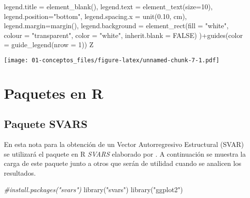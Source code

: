 \documentclass[
]{book}
\newenvironment{Shaded}{\begin{snugshade}}{\end{snugshade}}
\newcommand{\AttributeTok}[1]{\textcolor[rgb]{0.77,0.63,0.00}{#1}}
\newcommand{\CommentTok}[1]{\textcolor[rgb]{0.56,0.35,0.01}{\textit{#1}}}
\newcommand{\ConstantTok}[1]{\textcolor[rgb]{0.00,0.00,0.00}{#1}}
\newcommand{\DecValTok}[1]{\textcolor[rgb]{0.00,0.00,0.81}{#1}}
\newcommand{\FloatTok}[1]{\textcolor[rgb]{0.00,0.00,0.81}{#1}}
\newcommand{\FunctionTok}[1]{\textcolor[rgb]{0.00,0.00,0.00}{#1}}
\newcommand{\NormalTok}[1]{#1}
\newcommand{\SpecialCharTok}[1]{\textcolor[rgb]{0.00,0.00,0.00}{#1}}
\newcommand{\StringTok}[1]{\textcolor[rgb]{0.31,0.60,0.02}{#1}}
\begin{document}
\begin{Shaded}
\begin{Highlighting}[]
           \AttributeTok{legend.title =} \FunctionTok{element\_blank}\NormalTok{(),}
           \AttributeTok{legend.text  =} \FunctionTok{element\_text}\NormalTok{(}\AttributeTok{size=}\DecValTok{10}\NormalTok{),}
           \AttributeTok{legend.position=}\StringTok{"bottom"}\NormalTok{,}
           \AttributeTok{legend.spacing.x =} \FunctionTok{unit}\NormalTok{(}\FloatTok{0.10}\NormalTok{, }\StringTok{\textquotesingle{}cm\textquotesingle{}}\NormalTok{),}
           \AttributeTok{legend.margin=}\FunctionTok{margin}\NormalTok{(),}
           \AttributeTok{legend.background =} \FunctionTok{element\_rect}\NormalTok{(}\AttributeTok{fill =} \StringTok{"white"}\NormalTok{, }\AttributeTok{colour =} \StringTok{"transparent"}\NormalTok{,}
                                            \AttributeTok{color =} \StringTok{"white"}\NormalTok{, }\AttributeTok{inherit.blank =} \ConstantTok{FALSE}\NormalTok{)}
\NormalTok{)}\SpecialCharTok{+}\FunctionTok{guides}\NormalTok{(}\AttributeTok{color =} \FunctionTok{guide\_legend}\NormalTok{(}\AttributeTok{nrow =} \DecValTok{1}\NormalTok{))}
\NormalTok{Z}
\end{Highlighting}
\end{Shaded}

\texttt{[image: 01-conceptos\_files/figure-latex/unnamed-chunk-7-1.pdf]}

\hypertarget{paquetes-en-r}{%
\chapter{Paquetes en R}\label{paquetes-en-r}}

\hypertarget{paquete-svars}{%
\section{Paquete SVARS}\label{paquete-svars}}

En esta nota para la obtención de un Vector Autorregresivo Estructural (SVAR) se utilizará el paquete en R \emph{SVARS} elaborado por \citet{SVAR21}. A continuación se muestra la carga de este paquete junto a otros que serán de utilidad cuando se analicen los resultados.

\begin{Shaded}
\begin{Highlighting}[]
\CommentTok{\#install.packages("svars")}
\FunctionTok{library}\NormalTok{(}\StringTok{"svars"}\NormalTok{)}
\FunctionTok{library}\NormalTok{(}\StringTok{"ggplot2"}\NormalTok{)}
\end{Highlighting}
\end{Shaded}
\end{document}
